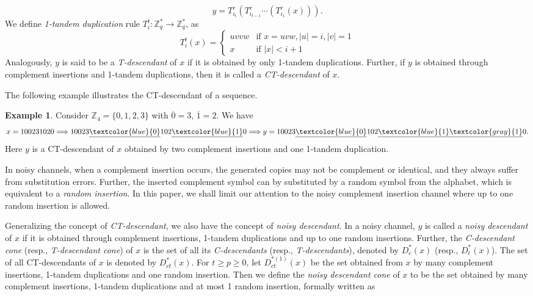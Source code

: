 \documentclass[pdflatex,sn-mathphys-num]{sn-jnl}
\theoremstyle{theorem}%
\theoremstyle{definition}
\newtheorem{example}{Example}
\theoremstyle{construction}
\newtheorem{open problem}{Open problem}
\begin{document}
	$$y=T^{c}_{i_{t}}(T^{c}_{i_{t-1}}\cdots (T^{c}_{i_{1}}(x))).$$
	We define  \textit{1-tandem duplication} rule $T^{t}_{i} : \mathbb{Z}_{q}^{*} \longrightarrow \mathbb{Z}_{q}^{*}$, as
	\begin{equation}
	T^{t}_{i}(x)=
	\begin{cases} 
		uvvw & \text{if } x =uvw , |u| = i, |v| = 1 \\ 
		x & \text{if } |x| < i + 1
	\end{cases}	
\end{equation}
		Analogously, $y$ is said to be a \emph{T-descendant} of $x$ if it is obtained by only 1-tandem duplications. Further, if $y$ is obtained through complement insertions and 1-tandem duplications, then it is called a \emph{CT-descendant} of $x$.
		
		The following example illustrates the CT-descendant of a sequence.
	\begin{example}\label{example RC}
		Consider $\mathbb{Z}_4=\{0, 1, 2, 3\}$ with $\overline{0}=3$, $\overline{1}=2$. We have
		$$x=100231020\Longrightarrow 10023\underline{\textcolor{blue}{0}}102\underline{\textcolor{blue}{1}}0\Longrightarrow y= 10023\underline{\textcolor{blue}{0}}102\underline{\textcolor{blue}{1}}\underline{\textcolor{gray}{1}}0.$$ Here $y$ is a CT-descendant of $x$ obtained by two complement insertions and one 1-tandem duplication.
	\end{example}
In noisy channels, when a complement insertion occurs, the generated copies may not be complement or identical, and they always suffer from substitution errors. Further, the inserted complement symbol can by substituted by a random symbol from the alphabet, which is equivalent to a \textit{random insertion}. In this paper, we shall limit our attention to the noisy complement insertion channel where up to one random insertion is allowed.\par 
Generalizing the concept of \emph{CT-descendant}, we also have the concept of \emph{noisy descendant}. In a noisy channel, $y$ is called a \emph{noisy descendant} of $x$ if it is obtained through complement insertions, 1-tandem duplications and up to one random insertions. Further, the \emph{C-descendant cone} (resp., \emph{T-descendant cone}) of $x$ is the set of all its \emph{C-descendants} (resp., \emph{T-descendants}), denoted by $D^{*}_{c}(x)$ (resp., $D^{*}_{t}(x)$). The set of all  CT-descendants of $x$ is denoted by $D^{*}_{ct}(x)$. For $t\ge p\ge 0$, let $D^{*(1)}_{ct}(x)$ be the set obtained from $x$ by many complement insertions, 1-tandem duplications and one random insertion. Then we define the \emph{noisy descendant cone} of $x$ to be the set obtained by many complement insertions, 1-tandem duplications and at most 1 random insertion, formally written as 
\end{document}
